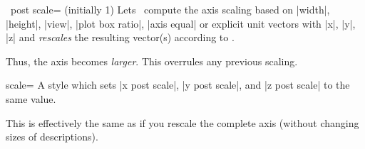 \begin{pgfplotsxykeylist}{\x\ post scale= (initially 1)}
	Lets \PGFPlots\ compute the axis scaling based on |width|, |height|, |view|, |plot box ratio|, |axis equal| or explicit unit vectors with |x|, |y|, |z| and \emph{rescales} the resulting vector(s) according to .
\begin{codeexample}[]
\end{codeexample}
	Thus, the axis becomes \emph{larger}. This overrules any previous scaling.

\begin{codeexample}[]
\end{codeexample}
\end{pgfplotsxykeylist}

\begin{pgfplotskey}{scale=}
	A style which sets |x post scale|, |y post scale|, and |z post scale| to the same  value.

	This is effectively the same as if you rescale the complete axis (without changing sizes of descriptions).
\end{pgfplotskey}
